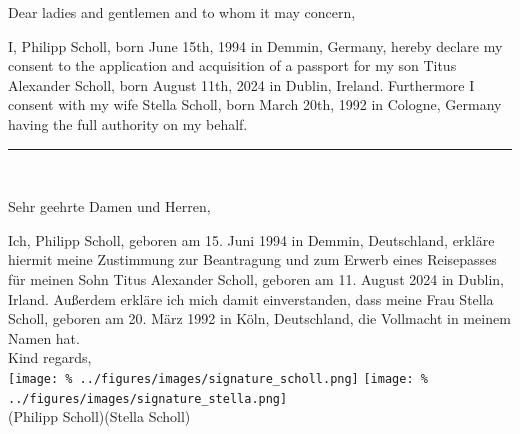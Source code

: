 \documentclass[
  fontsize=11pt,
  paper=a4,
  parskip=half,
  enlargefirstpage=on,    %
  fromalign=right,        %
  fromphone=on,           %
  fromrule=aftername,     %
  addrfield=off,           %
  backaddress=off,         %
  subject=beforeopening,  %
  locfield=narrow,        %
  foldmarks=on,           %
]{scrlttr2}
\begin{document}
\begin{letter}{}
  \opening{Dear ladies and gentlemen and to whom it may concern,}

  I, Philipp Scholl, born June 15th, 1994 in Demmin, Germany, hereby declare my consent to the application and acquisition of a passport for my son Titus Alexander Scholl, born August 11th, 2024 in Dublin, Ireland. Furthermore I consent with my wife Stella Scholl, born March 20th, 1992 in Cologne, Germany having the full authority on my behalf.\\%

  \vspace{0.5cm}
  \hrule\\%
  \vspace{0.5cm}

  Sehr geehrte Damen und Herren,%
  
  Ich, Philipp Scholl, geboren am 15. Juni 1994 in Demmin, Deutschland, erkläre hiermit meine Zustimmung zur Beantragung und zum Erwerb eines Reisepasses für meinen Sohn Titus Alexander Scholl, geboren am 11. August 2024 in Dublin, Irland. Außerdem erkläre ich mich damit einverstanden, dass meine Frau Stella Scholl, geboren am 20. März 1992 in Köln, Deutschland, die Vollmacht in meinem Namen hat.\\%

  Kind regards,\\%
  \texttt{[image: \%
    ../figures/images/signature\_scholl.png]}%
  \hspace*{1.5cm}%
  \texttt{[image: \%
    ../figures/images/signature\_stella.png]}\\[-0.5cm]%
  (Philipp Scholl)\hspace*{2.5cm}(Stella Scholl)%

\end{letter}
\end{document}
